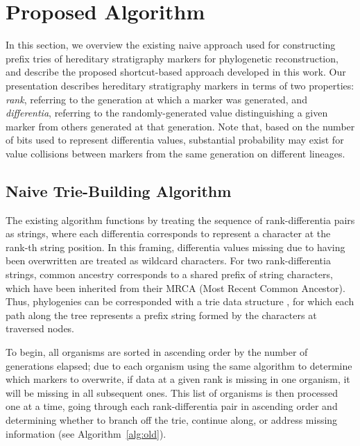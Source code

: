 \section{Proposed Algorithm} \label{sec:algorithm}

In this section, we overview the existing naive approach used for constructing prefix tries of hereditary stratigraphy markers for phylogenetic reconstruction, and describe the proposed shortcut-based approach developed in this work.
Our presentation describes hereditary stratigraphy markers in terms of two properties: \textit{rank}, referring to the generation at which a marker was generated, and \textit{differentia}, referring to the randomly-generated value distinguishing a given marker from others generated at that generation.
Note that, based on the number of bits used to represent differentia values, substantial probability may exist for value collisions between markers from the same generation on different lineages.

\subsection{Naive Trie-Building Algorithm} \label{sec:algorithm:naive}

The existing algorithm functions by treating the sequence of rank-differentia pairs as strings, where each differentia corresponds to represent a character at the rank-th string position.
In this framing, differentia values missing due to having been overwritten are treated as wildcard characters.
For two rank-differentia strings, common ancestry corresponds to a shared prefix of string characters, which have been inherited from their MRCA (Most Recent Common Ancestor).
Thus, phylogenies can be corresponded with a trie data structure \citep{fredkin1960trie}, for which each path along the tree represents a prefix string formed by the characters at traversed nodes.

To begin, all organisms are sorted in ascending order by the number of generations elapsed; due to each organism using the same algorithm to determine which markers to overwrite, if data at a given rank is missing in one organism, it will be missing in all subsequent ones.
This list of organisms is then processed one at a time, going through each rank-differentia pair in ascending order and determining whether to branch off the trie, continue along, or address missing information (see Algorithm~\ref{alg:old}).



